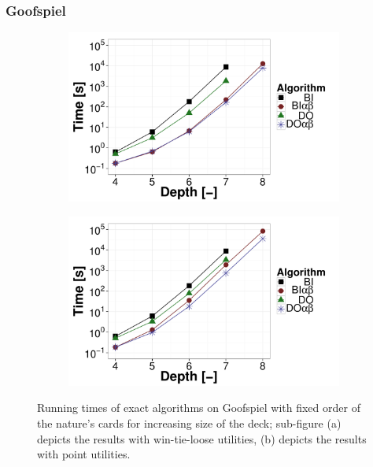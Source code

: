 \subsubsection{Goofspiel}
\begin{figure} [t]
\centering
	\begin{subfigure}{0.49\textwidth}
 		\includegraphics[width=1\textwidth]{figures/GS-BT-NF.pdf}\caption{}\label{fig:off:res:gs-bt}
 	\end{subfigure}
	\begin{subfigure}{0.49\textwidth}
 		\includegraphics[width=1\textwidth]{figures/GS-BF-NF.pdf}\caption{}\label{fig:off:res:gs-bf}
 	\end{subfigure}
\caption{Running times of exact algorithms on Goofspiel with fixed order of the nature's cards for increasing size of the deck; sub-figure (a) depicts the results with win-tie-loose utilities, (b) depicts the results with point utilities.} \label{fig:off:res:gs}
\end{figure}

